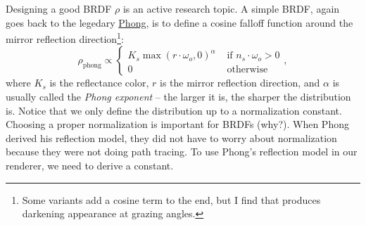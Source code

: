 Designing a good BRDF $\rho$ is an active research topic. A simple BRDF, again goes back to the legedary \href{https://en.wikipedia.org/wiki/Phong_reflection_model}{Phong}, is to define a cosine falloff function around the mirror reflection direction\footnote{Some variants add a cosine term to the end, but I find that produces darkening appearance at grazing angles.}:
\begin{equation}
\rho_{\text{phong}} \propto \begin{cases}
K_s \max\left(r \cdot \omega_o, 0\right)^\alpha & \text{ if } n_s \cdot \omega_o > 0 \\
0 & \text{ otherwise} 
\end{cases},
\end{equation}
where $K_s$ is the reflectance color, $r$ is the mirror reflection direction, and $\alpha$ is usually called the \emph{Phong exponent} -- the larger it is, the sharper the distribution is. Notice that we only define the distribution up to a normalization constant. Choosing a proper normalization is important for BRDFs (why?). When Phong derived his reflection model, they did not have to worry about normalization because they were not doing path tracing. To use Phong's reflection model in our renderer, we need to derive a constant.

